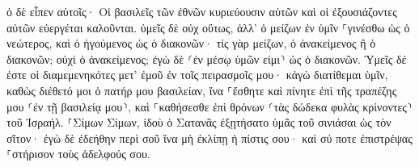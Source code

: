 \documentclass{openreader}
\begin{document}
ὁ δὲ εἶπεν αὐτοῖς· Οἱ βασιλεῖς τῶν ἐθνῶν κυριεύουσιν αὐτῶν καὶ οἱ ἐξουσιάζοντες αὐτῶν εὐεργέται καλοῦνται. 
ὑμεῖς δὲ οὐχ οὕτως, ἀλλ’ ὁ μείζων ἐν ὑμῖν ⸀γινέσθω ὡς ὁ νεώτερος, καὶ ὁ ἡγούμενος ὡς ὁ διακονῶν· 
τίς γὰρ μείζων, ὁ ἀνακείμενος ἢ ὁ διακονῶν; οὐχὶ ὁ ἀνακείμενος; ἐγὼ δὲ ⸂ἐν μέσῳ ὑμῶν εἰμι⸃ ὡς ὁ διακονῶν. 
Ὑμεῖς δέ ἐστε οἱ διαμεμενηκότες μετ’ ἐμοῦ ἐν τοῖς πειρασμοῖς μου· 
κἀγὼ διατίθεμαι ὑμῖν, καθὼς διέθετό μοι ὁ πατήρ μου βασιλείαν, 
ἵνα ⸀ἔσθητε καὶ πίνητε ἐπὶ τῆς τραπέζης μου ⸂ἐν τῇ βασιλείᾳ μου⸃, καὶ ⸀καθήσεσθε ἐπὶ θρόνων ⸂τὰς δώδεκα φυλὰς κρίνοντες⸃ τοῦ Ἰσραήλ. 
⸀Σίμων Σίμων, ἰδοὺ ὁ Σατανᾶς ἐξῃτήσατο ὑμᾶς τοῦ σινιάσαι ὡς τὸν σῖτον· 
ἐγὼ δὲ ἐδεήθην περὶ σοῦ ἵνα μὴ ἐκλίπῃ ἡ πίστις σου· καὶ σύ ποτε ἐπιστρέψας ⸀στήρισον τοὺς ἀδελφούς σου. 
\end{document}
